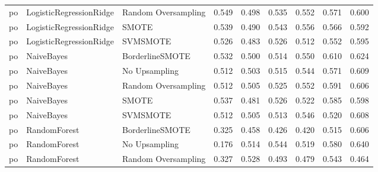 \begin{tabular}{lllllllll}
      po &      LogisticRegressionRidge & Random Oversampling & 0.549 &                     0.498 &                 0.535 &                  0.552 &                                   0.571 &     0.600 \\
      po &      LogisticRegressionRidge &               SMOTE & 0.539 &                     0.490 &                 0.543 &                  0.556 &                                   0.566 &     0.592 \\
      po &      LogisticRegressionRidge &            SVMSMOTE & 0.526 &                     0.483 &                 0.526 &                  0.512 &                                   0.552 &     0.595 \\
      po &                   NaiveBayes &     BorderlineSMOTE & 0.532 &                     0.500 &                 0.514 &                  0.550 &                                   0.610 &     0.624 \\
      po &                   NaiveBayes &       No Upsampling & 0.512 &                     0.503 &                 0.515 &                  0.544 &                                   0.571 &     0.609 \\
      po &                   NaiveBayes & Random Oversampling & 0.512 &                     0.505 &                 0.525 &                  0.552 &                                   0.591 &     0.606 \\
      po &                   NaiveBayes &               SMOTE & 0.537 &                     0.481 &                 0.526 &                  0.522 &                                   0.585 &     0.598 \\
      po &                   NaiveBayes &            SVMSMOTE & 0.512 &                     0.505 &                 0.513 &                  0.546 &                                   0.520 &     0.608 \\
      po &                 RandomForest &     BorderlineSMOTE & 0.325 &                     0.458 &                 0.426 &                  0.420 &                                   0.515 &     0.606 \\
      po &                 RandomForest &       No Upsampling & 0.176 &                     0.514 &                 0.544 &                  0.519 &                                   0.580 &     0.640 \\
      po &                 RandomForest & Random Oversampling & 0.327 &                     0.528 &                 0.493 &                  0.479 &                                   0.543 &     0.464 \\

\end{tabular}
